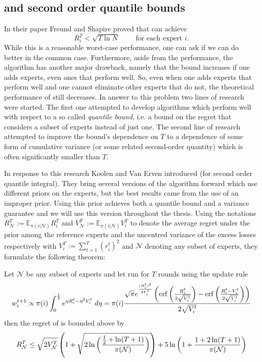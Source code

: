 \subsection{\squint and second order quantile bounds}
\label{subsec:squint}
In their paper \cite{Freund1997} Freund and Shapire proved  that \hedge can achieve $$R^T_i < \sqrt{T \ln N}\qquad \text{ for each expert } i.$$ While this is a reasonable worst-case performance, one can ask if we can do better in the common case. Furthermore, aside from the performance, the algorithm has another major drawback, namely that the bound increases if one adds experts, even ones that perform well. So, even when one adds experts that perform well and one cannot eliminate other experts that do not, the theoretical performance of \hedge still decreases. 
In answer to this problem two lines of research were started. The first one attempted to develop algorithms which perform well with respect to a so called \textit{quantile bound}, i.e. a bound on the regret that considers a subset of experts instead of just one. The second line of research attempted to improve the bound's dependence on $T$ to a dependence of some form of cumulative variance (or some related second-order quantity) which is often significantly smaller than $T$. 

\par In response to this research Koolen and Van Erven introduced \squint\cite{Koolen2015} (for second order quantile integral). They bring several versions of the algorithm forward which use different priors on the experts, but the best results came from the use of an improper prior. Using this prior \squint achieves both a quantile bound and a variance guarantee and we will use this version throughout the thesis. Using the notations $R^T_\mathcal{N} := \mathbb{E}_{\pi(i|\mathcal N)}R^T_i$ and  $V^T_\mathcal{N} := \mathbb{E}_{\pi(i|\mathcal N)}V^T_i$ to denote the average regret under the prior among the reference experts and the uncentred variance of the excess losses respectively with $V^T_i := \sum^T_{t=1}(r^t_i)^2$ and $\mathcal N$ denoting any subset of experts, they formulate the following theorem:

 \begin{theorem}\label{Thm:SquintPerf}\cite{Koolen2015}
 Let $\mathcal{N}$ be any subset of experts and let \squint run for $T$ rounds using the update rule
  $$w^{t+1}_i \propto \pi(i)\int_0^{\frac12}e^{\eta R^t_i-\eta^2V_i^t} \;d\eta=\pi(i) \frac{\sqrt{\pi}e^{\frac{(R^t_i)^2}{4V^t_i}}\left(\operatorname{erf}\left(\frac{R^t_i}{2\sqrt{V_i^t}}\right)-\operatorname{erf}\left(\frac{R_i^t-V_i^t}{2\sqrt{V_i^t}}\right)\right)}{2\sqrt{V_i^t}}$$
  then the regret of \squint is bounded above by
  $$R^T_\mathcal{N}\leq \sqrt{2V^T_\mathcal N}\left(1+\sqrt{2\ln\left(\frac{\frac12+\ln(T+1)}{\pi(\mathcal{N})}\right)}\right)+5\ln\left(1+\frac{1+2\ln(T+1)}{\pi(\mathcal N)}\right)$$

 \end{theorem}

